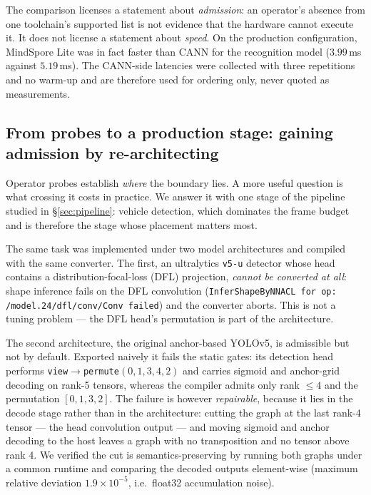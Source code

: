\documentclass[conference]{IEEEtran}
\begin{document}
The comparison licenses a statement about \emph{admission}: an operator's
absence from one toolchain's supported list is not evidence that the hardware
cannot execute it. It does not license a statement about \emph{speed}. On the
production configuration, MindSpore Lite was in fact faster than CANN for the
recognition model ($3.99$\,ms against $5.19$\,ms). The CANN-side latencies were
collected with three repetitions and no warm-up and are therefore used for
ordering only, never quoted as measurements.

\subsection{From probes to a production stage: gaining admission by re-architecting}

Operator probes establish \emph{where} the boundary lies. A more useful question
is what crossing it costs in practice. We answer it with one stage of the
pipeline studied in \S\ref{sec:pipeline}: vehicle detection, which dominates the
frame budget and is therefore the stage whose placement matters most.

The same task was implemented under two model architectures and compiled with
the same converter. The first, an ultralytics \texttt{v5-u} detector whose head
contains a distribution-focal-loss (DFL) projection, \emph{cannot be converted
at all}: shape inference fails on the DFL convolution
(\texttt{InferShapeByNNACL for op: /model.24/dfl/conv/Conv failed}) and the
converter aborts. This is not a tuning problem --- the DFL head's permutation is
part of the architecture.

The second architecture, the original anchor-based YOLOv5, is admissible but not
by default. Exported naively it fails the static gates: its detection head
performs \texttt{view}$\rightarrow$\texttt{permute}$(0,1,3,4,2)$ and carries
sigmoid and anchor-grid decoding on rank-5 tensors, whereas the compiler admits
only rank $\le 4$ and the permutation $[0,1,3,2]$. The failure is however
\emph{repairable}, because it lies in the decode stage rather than in the
architecture: cutting the graph at the last rank-4 tensor --- the head
convolution output --- and moving sigmoid and anchor decoding to the host leaves
a graph with no transposition and no tensor above rank 4. We verified the cut is
semantics-preserving by running both graphs under a common runtime and comparing
the decoded outputs element-wise (maximum relative deviation
$1.9\times10^{-5}$, i.e.\ float32 accumulation noise).
\end{document}
